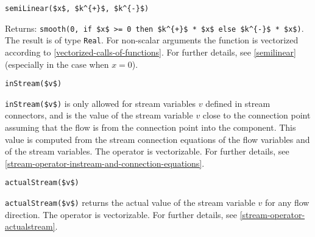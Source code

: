 \begin{operatordefinition}[semiLinear]
\begin{synopsis}\begin{lstlisting}
semiLinear($x$, $k^{+}$, $k^{-}$)
\end{lstlisting}\end{synopsis}
\begin{semantics}
Returns: \lstinline!smooth(0, if $x$ >= 0 then $k^{+}$ * $x$ else $k^{-}$ * $x$)!.
The result is of type \lstinline!Real!.
For non-scalar arguments the function is vectorized according to \cref{vectorized-calls-of-functions}.
For further details, see \cref{semilinear} (especially in the case when $x = 0$).
\end{semantics}
\end{operatordefinition}

\begin{operatordefinition}[inStream]
\begin{synopsis}\begin{lstlisting}
inStream($v$)
\end{lstlisting}\end{synopsis}
\begin{semantics}
\lstinline!inStream($v$)! is only allowed for stream variables $v$ defined in stream connectors, and is the value of the stream variable $v$ close to the connection point assuming that the flow is from the connection point into the component.
This value is computed from the stream connection equations of the flow variables and of the stream variables.
The operator is vectorizable.
For further details, see \cref{stream-operator-instream-and-connection-equations}.
\end{semantics}
\end{operatordefinition}

\begin{operatordefinition}[actualStream]
\begin{synopsis}\begin{lstlisting}
actualStream($v$)
\end{lstlisting}\end{synopsis}
\begin{semantics}
\lstinline!actualStream($v$)! returns the actual value of the stream variable $v$ for any flow direction.
The operator is vectorizable.
For further details, see \cref{stream-operator-actualstream}.
\end{semantics}
\end{operatordefinition}

